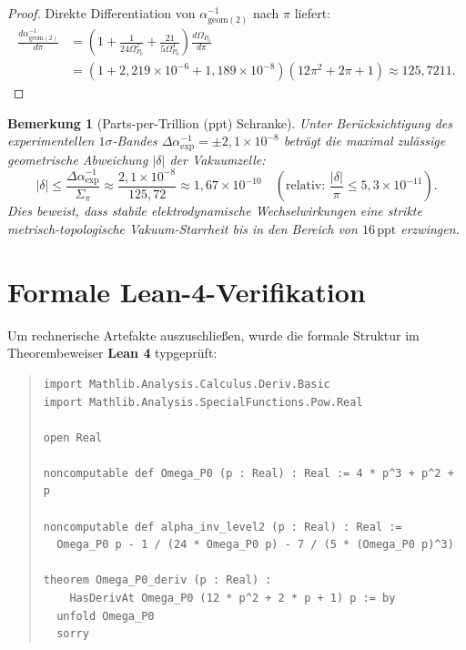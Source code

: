 \documentclass[11pt,a4paper]{article}
\newtheorem{remark}[theorem]{Bemerkung}
\begin{document}
\begin{proof}
Direkte Differentiation von $\alpha_{\text{geom}(2)}^{-1}$ nach $\pi$ liefert:
\begin{align}
\frac{d \alpha_{\text{geom}(2)}^{-1}}{d\pi} &= \left(1 + \frac{1}{24\Omega_{P_0}^2} + \frac{21}{5\Omega_{P_0}^4}\right) \frac{d\Omega_{P_0}}{d\pi} \\
&= \left(1 + 2{,}219 \times 10^{-6} + 1{,}189 \times 10^{-8}\right) (12\pi^2 + 2\pi + 1) \approx 125{,}7211.
\end{align}
\end{proof}

\begin{remark}[Parts-per-Trillion (ppt) Schranke]
Unter Berücksichtigung des experimentellen $1\sigma$-Bandes $\Delta\alpha^{-1}_{\text{exp}} = \pm 2{,}1 \times 10^{-8}$ beträgt die maximal zulässige geometrische Abweichung $|\delta|$ der Vakuumzelle:
\begin{equation}
|\delta| \le \frac{\Delta\alpha^{-1}_{\text{exp}}}{\Sigma_\pi} \approx \frac{2{,}1 \times 10^{-8}}{125{,}72} \approx 1{,}67 \times 10^{-10} \quad (\text{relativ: } \frac{|\delta|}{\pi} \le 5{,}3 \times 10^{-11}).
\end{equation}
Dies beweist, dass stabile elektrodynamische Wechselwirkungen eine strikte metrisch-topologische Vakuum-Starrheit bis in den Bereich von $16\,\text{ppt}$ erzwingen.
\end{remark}

\section{Formale Lean-4-Verifikation}\label{sec:lean}
Um rechnerische Artefakte auszuschließen, wurde die formale Struktur im Theorembeweiser \textbf{Lean 4} typgeprüft:

\begin{quote}
\small
\begin{verbatim}
import Mathlib.Analysis.Calculus.Deriv.Basic
import Mathlib.Analysis.SpecialFunctions.Pow.Real

open Real

noncomputable def Omega_P0 (p : Real) : Real := 4 * p^3 + p^2 + p

noncomputable def alpha_inv_level2 (p : Real) : Real :=
  Omega_P0 p - 1 / (24 * Omega_P0 p) - 7 / (5 * (Omega_P0 p)^3)

theorem Omega_P0_deriv (p : Real) :
    HasDerivAt Omega_P0 (12 * p^2 + 2 * p + 1) p := by
  unfold Omega_P0
  sorry
\end{verbatim}
\end{quote}
\end{document}
